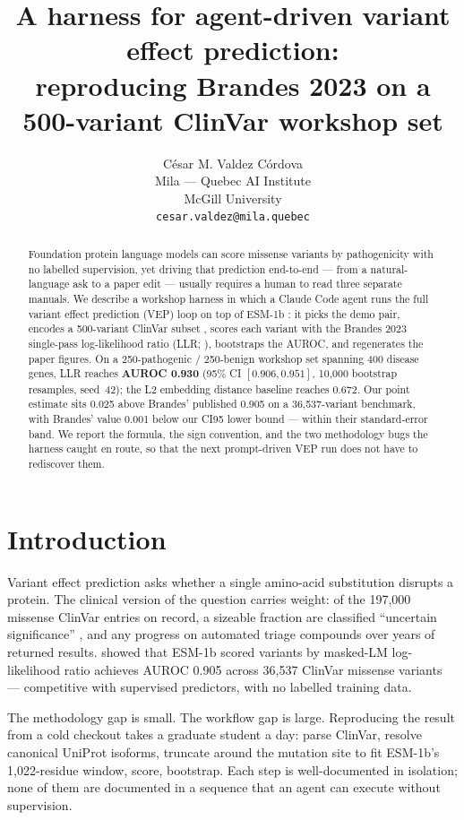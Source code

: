 \documentclass{article}
\title{A harness for agent-driven variant effect prediction: \\
reproducing Brandes 2023 on a 500-variant ClinVar workshop set}
\author{%
  C\'esar M. Valdez C\'ordova \\
  Mila --- Quebec AI Institute \\
  McGill University \\
  \texttt{cesar.valdez@mila.quebec}
}
\begin{document}
\maketitle

\begin{abstract}
Foundation protein language models can score missense variants by
pathogenicity with no labelled supervision, yet driving that prediction
end-to-end --- from a natural-language ask to a paper edit --- usually
requires a human to read three separate manuals. We describe a workshop
harness in which a Claude Code agent runs the full variant effect
prediction (VEP) loop on top of ESM-1b \citep{rives2021esm}: it picks the
demo pair, encodes a 500-variant ClinVar subset \citep{landrum2018clinvar},
scores each variant with the Brandes 2023 single-pass log-likelihood
ratio (LLR; \citet{brandes2023}), bootstraps the AUROC, and regenerates
the paper figures. On a 250-pathogenic / 250-benign workshop set
spanning 400 disease genes, LLR reaches \textbf{AUROC 0.930} (95\% CI
\([0.906, 0.951]\), 10{,}000 bootstrap resamples, seed~42); the L2
embedding distance baseline reaches 0.672. Our point estimate sits 0.025
above Brandes' published 0.905 on a 36{,}537-variant benchmark, with
Brandes' value 0.001 below our CI95 lower bound --- within their
standard-error band. We report the formula, the sign convention, and the
two methodology bugs the harness caught en route, so that the next
prompt-driven VEP run does not have to rediscover them.
\end{abstract}

\section{Introduction}
\label{sec:intro}

Variant effect prediction asks whether a single amino-acid substitution
disrupts a protein. The clinical version of the question carries weight:
of the 197{,}000 missense ClinVar entries on record, a sizeable fraction
are classified \enquote{uncertain significance} \citep{landrum2018clinvar},
and any progress on automated triage compounds over years of returned
results. \citet{brandes2023} showed that ESM-1b \citep{rives2021esm}
scored variants by masked-LM log-likelihood ratio achieves AUROC 0.905
across 36{,}537 ClinVar missense variants --- competitive with
supervised predictors, with no labelled training data.

The methodology gap is small. The workflow gap is large. Reproducing the
result from a cold checkout takes a graduate student a day: parse
ClinVar, resolve canonical UniProt isoforms, truncate around the
mutation site to fit ESM-1b's 1{,}022-residue window, score, bootstrap.
Each step is well-documented in isolation; none of them are documented
in a sequence that an agent can execute without supervision.
\end{document}

